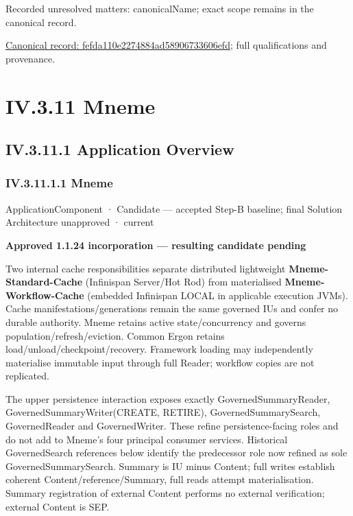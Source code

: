 {\small Recorded unresolved matters: canonicalName; exact scope remains in the canonical record.}\par
{\footnotesize \href{../../../../continuum/application/application-component/fefda110e2274884ad58906733606efd.md}{Canonical record: fefda110e2274884ad58906733606efd}; full qualifications and provenance.}\par
\section*{IV.3.11 Mneme}
\label{navigation:IV.3.11}

\subsection*{IV.3.11.1 Application Overview}
\label{navigation:IV.3.11.1}

\subsubsection*{IV.3.11.1.1 Mneme}
\label{navigation:IV.3.11.1.1}

\label{element:1af8a56358f7429fabfb57be66542a99}
{\small ApplicationComponent · Candidate — accepted Step-B baseline; final Solution Architecture unapproved · current}\par

\par\medskip\textbf{Approved 1.1.24 incorporation — resulting candidate pending}\par


Two internal cache responsibilities separate distributed lightweight \textbf{Mneme-Standard-Cache} (Infinispan Server/Hot Rod) from materialised \textbf{Mneme-Workflow-Cache} (embedded Infinispan LOCAL in applicable execution JVMs). Cache manifestations/generations remain the same governed IUs and confer no durable authority. Mneme retains active state/concurrency and governs population/refresh/eviction. Common Ergon retains load/unload/checkpoint/recovery. Framework loading may independently materialise immutable input through full Reader; workflow copies are not replicated.



The upper persistence interaction exposes exactly GovernedSummaryReader, GovernedSummaryWriter(CREATE, RETIRE), GovernedSummarySearch, GovernedReader and GovernedWriter. These refine persistence-facing roles and do not add to Mneme's four principal consumer services. Historical GovernedSearch references below identify the predecessor role now refined as sole GovernedSummarySearch. Summary is IU minus Content; full writes establish coherent Content/reference/Summary, full reads attempt materialisation. Summary registration of external Content performs no external verification; external Content is SEP.




